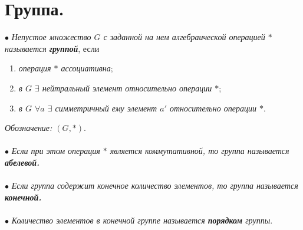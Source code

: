 \section{Группа.}
$\bullet$ \textit{Непустое множество $G$ с заданной на нем алгебраической операцией $*$ называется \textbf{группой}}, если \begin{enumerate}
	\item \textit{операция $*$ ассоциативна};
	\item \textit{в $G$ $\exists$ нейтральный элемент относительно операции $*$};
	\item \textit{в $G$ $\forall$$a$ $\exists$ симметричный ему элемент $a'$ относительно операции $*$}.
\end{enumerate}
\textit{Обозначение: $(G, *)$}.\\\\
$\bullet$ \textit{Если при этом операция $*$ является коммутативной, то группа называется \textbf{абелевой.}} \\\\
$\bullet$ \textit{Если группа содержит конечное количество элементов, то группа называется \textbf{конечной.}} \\\\
$\bullet$ \textit{Количество элементов в конечной группе называется \textbf{порядком} группы}.\\\\
